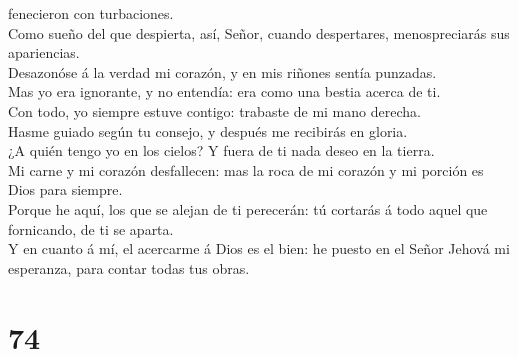 fenecieron con turbaciones.\\
 Como sueño del que despierta, así, Señor, cuando
despertares, menospreciarás sus apariencias.\\
 Desazonóse á la verdad mi corazón, y en mis riñones sentía
punzadas.\\
 Mas yo era ignorante, y no entendía: era como una bestia
acerca de ti.\\
 Con todo, yo siempre estuve contigo: trabaste de mi mano
derecha.\\
 Hasme guiado según tu consejo, y después me recibirás en
gloria.\\
 ¿A quién tengo yo en los cielos? Y fuera de ti nada deseo
en la tierra.\\
 Mi carne y mi corazón desfallecen: mas la roca de mi
corazón y mi porción es Dios para siempre.\\
 Porque he aquí, los que se alejan de ti perecerán: tú
cortarás á todo aquel que fornicando, de ti se aparta.\\
 Y en cuanto á mí, el acercarme á Dios es el bien: he
puesto en el Señor Jehová mi esperanza, para contar todas tus obras.

\hypertarget{section-73}{%
\section{74}\label{section-73}}


